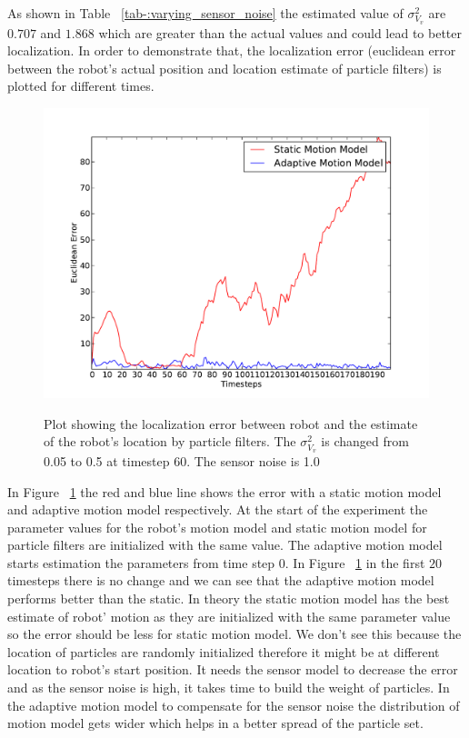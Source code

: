 \documentclass[12pt]{dalcsthesis}
\begin{document}
As shown in Table ~\ref{tab-:varying_sensor_noise} the estimated value of $\sigma_{V_{v}}^2$ are $0.707$ and $1.868$ which are greater than the actual values and could lead to better localization. In order to demonstrate that, the localization error (euclidean error between the robot's actual position and location estimate of particle filters) is plotted for different times.
\begin{figure}[h!]
  \centering
     {\includegraphics[height = 3.0 in]{./plots/200_005_05_s_10.pdf}}
  \caption{\label{fig-varying_sensor_noise}Plot showing the localization error between robot and the estimate of the robot's location by particle filters. The $\sigma_{V_{v}}^{2}$ is changed from 0.05 to 0.5 at timestep 60. The sensor noise is 1.0}
\end{figure}

In Figure ~\ref{fig-varying_sensor_noise} the red and blue line shows the error with a static motion model and adaptive motion model respectively. At the start of the experiment the parameter values for the robot's motion model and static motion model for particle filters are initialized with the same value. The adaptive motion model starts estimation the parameters from time step 0. In Figure ~\ref{fig-varying_sensor_noise} in the first $20$ timesteps there is no change and we can see that the adaptive motion model performs better than the static. In theory the static motion model has the best estimate of robot' motion as they are initialized with the same parameter value so the error should be less for static motion model. We don't see this because the location of particles are randomly initialized therefore it might be at different location to robot's start position. It needs the sensor model to decrease the error and as the sensor noise is high, it takes time to build the weight of particles. In the adaptive motion model to compensate for the sensor noise the distribution of motion model gets wider which helps in a better spread of the particle set.
\end{document}
